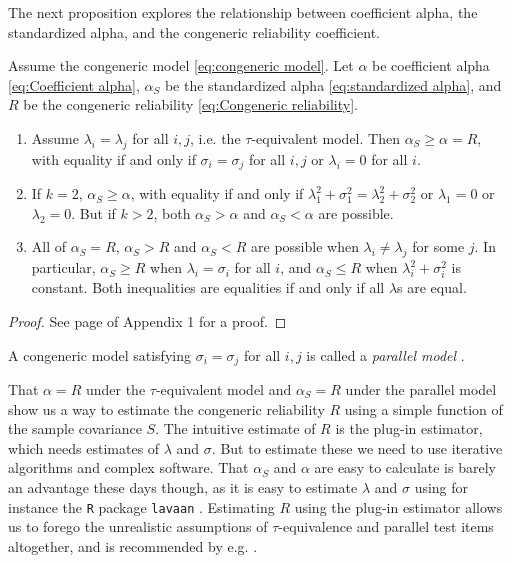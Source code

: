 \documentclass[twoside]{article}
\begin{document}
The next proposition explores the relationship between coefficient alpha, the standardized alpha, and the congeneric reliability coefficient.

\begin{prop}
\label{prop:Reliabilities.}Assume the congeneric model \eqref{eq:congeneric model}. Let $\alpha$ be coefficient alpha \eqref{eq:Coefficient alpha}, $\alpha_S$ be the standardized alpha \eqref{eq:standardized alpha}, and  $ R$ be the congeneric reliability \eqref{eq:Congeneric reliability}. 
\begin{enumerate}[label=(\roman*)]
\item Assume $\lambda_{i}=\lambda_{j}$ for all $i,j$, i.e. the $\tau$-equivalent model. Then $\alpha_S \geq \alpha =  R$, with equality if and only if $\sigma_{i}=\sigma_{j}$ for all $i,j$ or $\lambda_i = 0$ for all $i$.
\item If $k=2$, $\alpha_S\geq\alpha$, with equality if and only if $\lambda_{1}^{2}+\sigma_{1}^{2}=\lambda_{2}^{2}+\sigma_{2}^{2}$ or $\lambda_1 = 0$ or $\lambda_2 = 0$. But if $k>2$, both $\alpha_S>\alpha$
and $\alpha_S<\alpha$ are possible.
\item All of $\alpha_S= R$, $\alpha_S> R$ and $\alpha_S< R$
are possible when $\lambda_{i}\neq\lambda_{j}$ for some $j$. In particular, $\alpha_S \geq  R$ when $\lambda_i = \sigma_i$ for all $i$, and $\alpha_S \leq  R$ when $\lambda_i^2 + \sigma_i^2$ is constant. Both inequalities are equalities if and only if all $\lambda$s are equal.
\end{enumerate}
\end{prop}
\begin{proof}
See page \pageref{proof:Reliabilities.} of Appendix 1 for a proof.
\end{proof}

A congeneric model satisfying $\sigma_{i}=\sigma_{j}$ for all $i,j$ is called a \textit{parallel model} \citep[][section 2.13]{Lord1968-ax}. 

That $\alpha = R$ under the $\tau$-equivalent model and $\alpha_S = R$ under the parallel model show us a way to estimate the congeneric reliability $R$ using a simple function of the sample covariance $S$. The intuitive estimate of $R$ is the plug-in estimator, which needs estimates of $\lambda$ and $\sigma$. But to estimate these we need to use iterative algorithms and complex software. That $\alpha_S$ and $\alpha$ are easy to calculate is barely an advantage these days though, as it is easy to estimate $\lambda$ and $\sigma$ using for instance the \texttt{R} \citep{Team2013-tt} package \texttt{lavaan} \citep{Rosseel2012-yg}. Estimating $R$ using the plug-in estimator allows us to forego the unrealistic assumptions of $\tau$-equivalence and parallel test items altogether, and is recommended by e.g. \citet{McNeish2019-ea}.
\end{document}
